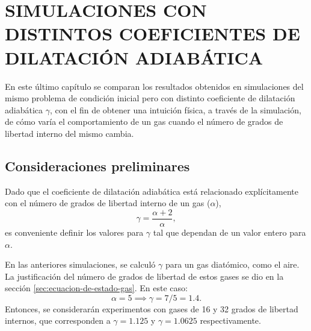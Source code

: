 \chapter{SIMULACIONES CON DISTINTOS COEFICIENTES DE DILATACIÓN ADIABÁTICA}
\label{cap:5}
En este último capítulo se comparan los resultados obtenidos en simulaciones del mismo problema de condición inicial pero con distinto coeficiente de dilatación adiabática $\gamma$, con el fin de obtener una intuición física, a través de la simulación, de cómo varía el comportamiento de un gas cuando el número de grados de libertad interno del mismo cambia.
\section{Consideraciones preliminares}
Dado que el coeficiente de dilatación adiabática está relacionado explícitamente con el número de grados de libertad interno de un gas ($\alpha$),
\begin{equation}
	\gamma = \frac{\alpha + 2}{\alpha},
\end{equation}
es conveniente definir los valores para $\gamma$ tal que dependan de un valor entero para $\alpha$.

En las anteriores simulaciones, se calculó $\gamma$ para un gas diatómico, como el aire. La justificación del número de grados de libertad de estos gases se dio en la sección \ref{sec:ecuacion-de-estado-gas}. En este caso:
\begin{equation}
	\alpha = 5 \implies \gamma = 7/5 = 1.4.
\end{equation}
Entonces, se considerarán experimentos con gases de 16 y 32 grados de libertad internos, que corresponden a $\gamma=1.125$ y $\gamma=1.0625$ respectivamente.
